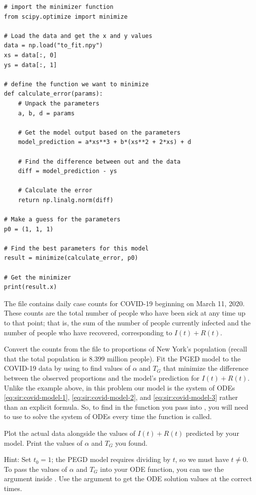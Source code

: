 \begin{lstlisting}
# import the minimizer function
from scipy.optimize import minimize

# Load the data and get the x and y values
data = np.load("to_fit.npy")
xs = data[:, 0]
ys = data[:, 1]

# define the function we want to minimize
def calculate_error(params):
    # Unpack the parameters
    a, b, d = params

    # Get the model output based on the parameters
    model_prediction = a*xs**3 + b*(xs**2 + 2*xs) + d

    # Find the difference between out and the data
    diff = model_prediction - ys

    # Calculate the error
    return np.linalg.norm(diff)

# Make a guess for the parameters
p0 = (1, 1, 1)

# Find the best parameters for this model
result = minimize(calculate_error, p0)

# Get the minimizer
print(result.x)
\end{lstlisting}


\begin{problem}\label{sir_nyc-model}
    The file  contains daily case counts for COVID-19 beginning on March 11, 2020.
    These counts are the total number of people who have been sick at any time up to that point; that is, the sum of the number of people currently infected and the number of people who have recovered, corresponding to $I(t)+R(t)$.

    Convert the counts from the file to proportions of New York's population (recall that the total population is 8.399 million people).
    Fit the PGED model to the COVID-19 data by using  to find values of $\alpha$ and $T_G$ that minimize the difference between the observed proportions and the model's prediction for $I(t)+R(t)$.
    Unlike the example above, in this problem our model is the system of ODEs \eqref{eq:sir:covid-model-1}, \eqref{eq:sir:covid-model-2}, and \eqref{eq:sir:covid-model-3} rather than an explicit formula.
    So, to find  in the function you pass into , you will need to use  to solve the system of ODEs every time the function is called.

    Plot the actual data alongside the values of $I(t)+R(t)$ predicted by your model.
    Print the values of $\alpha$ and $T_G$ you found.

    Hint: Set $t_0=1$; the PEGD model requires dividing by $t$, so we must have $t\ne0$.
    To pass the values of $\alpha$ and $T_G$ into your ODE function, you can use the argument  inside .
    Use the  argument to get the ODE solution values at the correct times.
\end{problem}

